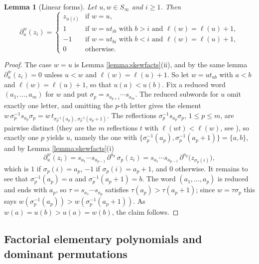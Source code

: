 \documentclass{amsart}
\newtheorem{lemma}{Lemma}[section]
\theoremstyle{definition}
\theoremstyle{remark}
\numberwithin{equation}{section}
\begin{document}
\begin{lemma}[Linear forms] \label{lemma:skewlinear}
Let $u,w\in S_\infty$ and $i\geq1$. Then
$$\partial^w_u(z_i)=\begin{cases}z_{u(i)}&\text{if }w=u,\\ 1&\text{if }w=ut_{ib}\text{ with }b>i\text{ and }\ell(w)=\ell(u)+1,\\ -1&\text{if }w=ut_{bi}\text{ with }b<i\text{ and }\ell(w)=\ell(u)+1,\\ 0&\text{otherwise.}\end{cases}$$
\end{lemma}
\begin{proof}
The case $w=u$ is Lemma \ref{lemma:skewfacts}(ii), and by the same lemma $\partial^w_u(z_i)=0$ unless $u<w$ and $\ell(w)=\ell(u)+1$. So let $w=ut_{ab}$ with $a<b$ and $\ell(w)=\ell(u)+1$, so that $u(a)<u(b)$. Fix a reduced word $(a_1,\ldots,a_m)$ for $w$ and put $\sigma_p=s_{a_{p+1}}\cdots s_{a_m}$. The reduced subwords for $u$ omit exactly one letter, and omitting the $p$-th letter gives the element $w\,\sigma_p^{-1}s_{a_p}\sigma_p=w\,t_{\sigma_p^{-1}(a_p),\,\sigma_p^{-1}(a_p+1)}$. The reflections $\sigma_p^{-1}s_{a_p}\sigma_p$, $1\leq p\leq m$, are pairwise distinct (they are the $m$ reflections $t$ with $\ell(wt)<\ell(w)$, see \cite[Section~1.6--1.7]{humphreys1992reflection}), so exactly one $p$ yields $u$, namely the one with $\{\sigma_p^{-1}(a_p),\sigma_p^{-1}(a_p+1)\}=\{a,b\}$, and by Lemma \ref{lemma:skewfacts}(i)
$$\partial^w_u(z_i)=s_{a_1}\cdots s_{a_{p-1}}\,\partial^{a_p}\,\sigma_p(z_i)=s_{a_1}\cdots s_{a_{p-1}}\,\partial^{a_p}\big(z_{\sigma_p(i)}\big),$$
which is $1$ if $\sigma_p(i)=a_p$, $-1$ if $\sigma_p(i)=a_p+1$, and $0$ otherwise. It remains to see that $\sigma_p^{-1}(a_p)=a$ and $\sigma_p^{-1}(a_p+1)=b$. The word $(a_1,\ldots,a_p)$ is reduced and ends with $a_p$, so $\tau=s_{a_1}\cdots s_{a_p}$ satisfies $\tau(a_p)>\tau(a_p+1)$; since $w=\tau\sigma_p$ this says $w(\sigma_p^{-1}(a_p))>w(\sigma_p^{-1}(a_p+1))$. As $w(a)=u(b)>u(a)=w(b)$, the claim follows.
\end{proof}

\subsection{Factorial elementary polynomials and dominant permutations}
\end{document}
